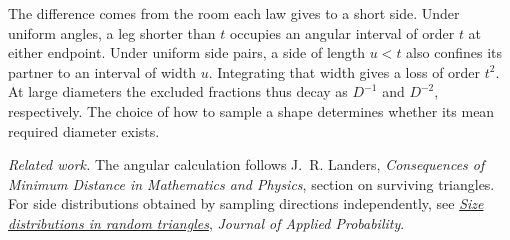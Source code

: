 \documentclass[11pt]{article}
\begin{document}
The difference comes from the room each law gives to a short side. Under
uniform angles, a leg shorter than $t$ occupies an angular interval of order
$t$ at either endpoint. Under uniform side pairs, a side of length $u<t$ also
confines its partner to an interval of width $u$. Integrating that width gives
a loss of order $t^2$. At large diameters the excluded fractions thus decay
as $D^{-1}$ and $D^{-2}$, respectively. The choice of how to sample a shape
determines whether its mean required diameter exists.

\smallskip
{\small\noindent\textit{Related work.}
The angular calculation follows J.~R. Landers,
\textit{Consequences of Minimum Distance in Mathematics and Physics},
section on surviving triangles. For side distributions obtained by sampling
directions independently, see
\href{https://www.cambridge.org/core/journals/journal-of-applied-probability/article/size-distributions-in-random-triangles/117ED3787DE9B79B1AC3862B0B6C3EAB}{\textit{Size distributions in random triangles}},
\textit{Journal of Applied Probability}.}
\end{document}
